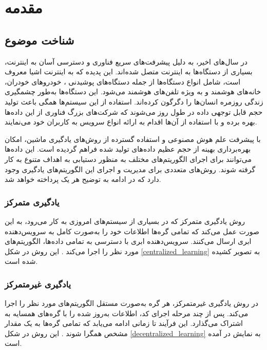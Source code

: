 \chapter{مقدمه}

\section{شناخت موضوع}
در سال‌های اخیر، به دلیل پیشرفت‌های سریع فناوری و دسترسی آسان به اینترنت، بسیاری از دستگاه‌ها به اینترنت متصل شده‌اند. این پدیده که به اینترنت اشیا%
معروف است، شامل انواع دستگاه‌ها از جمله دستگاه‌های پوشیدنی%
%
، خودروهای خودران، خانه‌های هوشمند%
و به ویژه تلفن‌های هوشمند%
می‌شود. این دستگاه‌ها به‌طور چشمگیری زندگی روزمره انسان‌ها را دگرگون کرده‌اند. استفاده از این سیستم‌ها همگی باعث تولید حجم قابل توجهی داده در طول روز می‌شوند که شرکت‌های بزرگ فناوری از این داده‌ها بهره برده و با استفاده از آن‌ها اقدام به ارائه انواع سرویس به کاربران خود می‌نمایند.

با پیشرفت علم هوش مصنوعی و استفاده گسترده از روش‌های یادگیری ماشین، امکان بهره‌برداری بهینه از حجم عظیم داده‌های تولید شده فراهم گردیده است. این داده‌ها می‌توانند برای اجرای الگوریتم‌های مختلف به منظور دستیابی به اهداف متنوع به کار گرفته شوند. روش‌های متعددی برای مدیریت و اجرای این الگوریتم‌های یادگیری وجود دارد که در ادامه به توضیح هر یک پرداخته خواهد شد.

\subsection{
	یادگیری متمرکز%
}
روش یادگیری متمرکز که در بسیاری از سیستم‌های امروزی به کار می‌رود، به این صورت عمل می‌کند که تمامی گره‌ها%
اطلاعات خود را به‌صورت کامل به سرویس‌دهنده ابری%
ارسال می‌کنند. سرویس‌دهنده ابری با دسترسی به تمامی داده‌ها، الگوریتم‌های مورد نظر را اجرا می‌کند
\cite{elbir2022family}.
این روش در شکل
\ref{centralized_learning}
به تصویر کشیده شده است.


\subsection{
	یادگیری غیرمتمرکز%
}
در روش یادگیری غیرمتمرکز، هر گره به‌صورت مستقل الگوریتم‌های مورد نظر را اجرا می‌کند. پس از چند مرحله اجرای کد، اطلاعات به‌روز شده را با گره‌های همسایه به اشتراک می‌گذارد. این فرآیند تا زمانی ادامه می‌یابد که تمامی گره‌ها به یک مقدار مشخص همگرا شوند
\cite{zhou2019edge}.
این روش در شکل
\ref{decentralized_learning}
به نمایش در آمده است.


